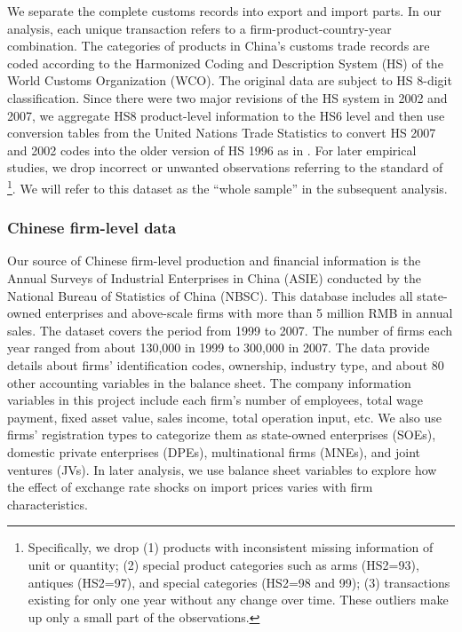 We separate the complete customs records into export and import parts. In our analysis, each unique transaction refers to a firm-product-country-year combination. The categories of products in China's customs trade records are coded according to the Harmonized Coding and Description System (HS) of the World Customs Organization (WCO). The original data are subject to HS 8-digit classification. Since there were two major revisions of the HS system in 2002 and 2007, we aggregate HS8 product-level information to the HS6 level and then use conversion tables from the United Nations Trade Statistics to convert HS 2007 and 2002 codes into the older version of HS 1996 as in \cite{fan-li-yeaple2015}. For later empirical studies, we drop incorrect or unwanted observations referring to the standard of \cite{lmx2015} \footnote{Specifically, we drop (1) products with inconsistent missing information of unit or quantity; (2) special product categories such as arms (HS2=93), antiques (HS2=97), and special categories (HS2=98 and 99); (3) transactions existing for only one year without any change over time. These outliers make up only a small part of the observations.}. We will refer to this dataset as the ``whole sample'' in the subsequent analysis.

\subsubsection{Chinese firm-level data} \label{Data-CIE}

Our source of Chinese firm-level production and financial information is the Annual Surveys of Industrial Enterprises in China (ASIE) conducted by the National Bureau of Statistics of China (NBSC). This database includes all state-owned enterprises and above-scale firms with more than 5 million RMB in annual sales. The dataset covers the period from 1999 to 2007. The number of firms each year ranged from about 130,000 in 1999 to 300,000 in 2007. The data provide details about firms’ identification codes, ownership, industry type, and about 80 other accounting variables in the balance sheet. The company information variables in this project include each firm's number of employees, total wage payment, fixed asset value, sales income, total operation input, etc. We also use firms’ registration types to categorize them as state-owned enterprises (SOEs), domestic private enterprises (DPEs), multinational firms (MNEs), and joint ventures (JVs). In later analysis, we use balance sheet variables to explore how the effect of exchange rate shocks on import prices varies with firm characteristics.

